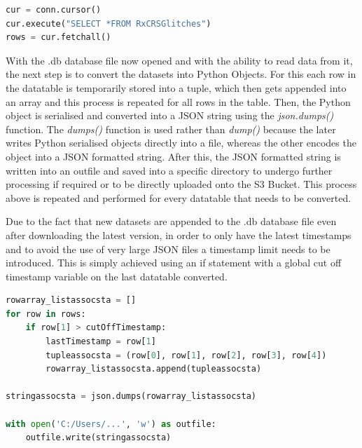 \begin{lstlisting}[language=Python, caption={SQLite3 Cursor Object and Its Execute and Fetchall Method Code Snippet}, label={lst:Connection Object}]
cur = conn.cursor()
cur.execute("SELECT *FROM RxCRSGlitches")
rows = cur.fetchall()
\end{lstlisting}

With the .db database file now opened and with the ability to read data from it, the next step is to convert the datasets into Python Objects. For this each row in the datatable is temporarily stored into a tuple, which then gets appended into an array and this process is repeated for all rows in the table. Then, the Python object is serialised and converted into a JSON string using the \textit{json.dumps()} function. The \textit{dumps()} function is used rather than \textit{dump()} because the later writes Python serialised objects directly into a file, whereas the other encodes the object into a JSON formatted string. After this, the JSON formatted string is written into an outfile and saved into a specific directory to undergo further processing if required or to be directly uploaded onto the S3 Bucket. This process above is repeated and performed for every datatable that needs to be converted. 

Due to the fact that new datasets are appended to the .db database file even after downloading the latest version, in order to only have the latest timestamps and to avoid the use of very large JSON files a timestamp limit needs to be introduced. This is simply achieved using an if statement with a global cut off timestamp variable on the last datatable converted. 

\begin{lstlisting}[language=Python, caption={JSON Conversion Code Snippet}, label={lst:conversion example}]
rowarray_listassocsta = []
for row in rows:
    if row[1] > cutOffTimestamp:
        lastTimestamp = row[1]
        tupleassocsta = (row[0], row[1], row[2], row[3], row[4])
        rowarray_listassocsta.append(tupleassocsta)
            
stringassocsta = json.dumps(rowarray_listassocsta)

with open('C:/Users/...', 'w') as outfile:
    outfile.write(stringassocsta)
\end{lstlisting}

